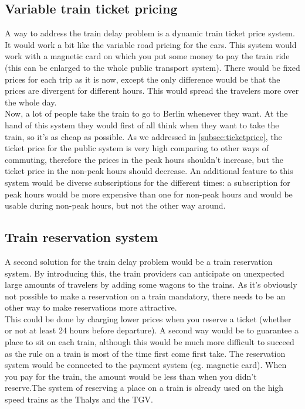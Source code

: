 \subsection{Variable train ticket pricing} \label{subsec:ticketPriceSolution}
A way to address the train delay problem is a dynamic train ticket price system. It would work a bit like the variable road pricing for the cars. This system would work with a magnetic card on which you put some money to pay the train ride (this can be enlarged to the whole public transport system). There would be fixed prices for each trip as it is now, except the only difference would be that the prices are divergent for different hours. This would spread the travelers more over the whole day. \\ \newline
 Now, a lot of people take the train to go to Berlin whenever they want. At the hand of this system they would first of all think when they want to take the train, so it's as cheap as possible. As we addressed in \ref{subsec:ticketprice}, the ticket price for the public system is very high comparing to other ways of commuting, therefore the prices in the peak hours shouldn't increase, but the ticket price in the non-peak hours should decrease. An additional feature to this system would be diverse subscriptions for the different times: a subscription for peak hours would be more expensive than one for non-peak hours and would be usable during non-peak hours, but not the other way around. 
 
\subsection{Train reservation system}\label{subsec:resSys}
A second solution for the train delay problem would be a train reservation system. By introducing this, the train providers can anticipate on unexpected large amounts of travelers by adding some wagons to the trains. As it's obviously not possible to make a reservation on a train mandatory, there needs to be an other way to make reservations more attractive. \\ \newline
This could be done by charging lower prices when you reserve a ticket (whether or not at least 24 hours before departure). A second way would be to guarantee a place to sit on each train, although this would be much more difficult to succeed as the rule on a train is most of the time first come first take. 
The reservation system would be connected to the payment system (eg. magnetic card). When you pay for the train, the amount would be less than when you didn't reserve.The system of reserving a place on a train is already used on the high speed trains as the Thalys and the TGV.  

